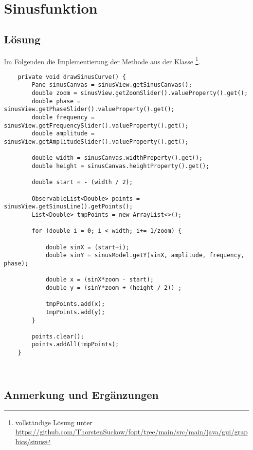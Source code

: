 \section{Sinusfunktion}\label{ch:sinusfunktion}


\subsection{Lösung}

Im Folgenden die Implementierung der Methode  aus der Klasse \footnote{
    vollständige Lösung unter \url{https://github.com/ThorstenSuckow/fopt/tree/main/src/main/java/gui/graphics/sinus}
}.

\begin{verbatim}
    private void drawSinusCurve() {
        Pane sinusCanvas = sinusView.getSinusCanvas();
        double zoom = sinusView.getZoomSlider().valueProperty().get();
        double phase = sinusView.getPhaseSlider().valueProperty().get();
        double frequency = sinusView.getFrequencySlider().valueProperty().get();
        double amplitude = sinusView.getAmplitudeSlider().valueProperty().get();

        double width = sinusCanvas.widthProperty().get();
        double height = sinusCanvas.heightProperty().get();

        double start = - (width / 2);

        ObservableList<Double> points = sinusView.getSinusLine().getPoints();
        List<Double> tmpPoints = new ArrayList<>();

        for (double i = 0; i < width; i+= 1/zoom) {

            double sinX = (start+i);
            double sinY = sinusModel.getY(sinX, amplitude, frequency, phase);

            double x = (sinX*zoom - start);
            double y = (sinY*zoom + (height / 2)) ;

            tmpPoints.add(x);
            tmpPoints.add(y);
        }

        points.clear();
        points.addAll(tmpPoints);
    }
\end{verbatim}\\


\subsection{Anmerkung und Ergänzungen}

